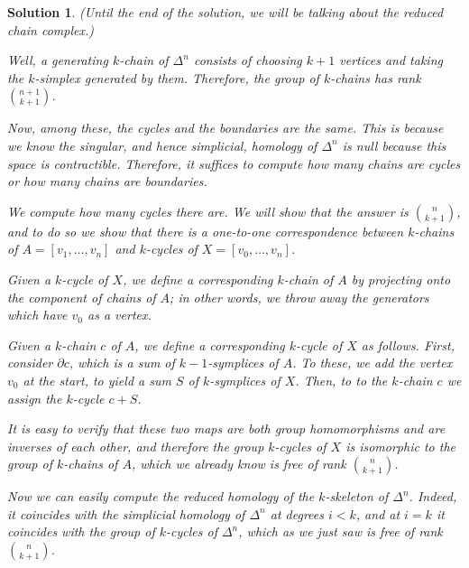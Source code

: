 \documentclass{article}
\theoremstyle{plain}
\theoremstyle{nonumberplain}
\newtheorem{sol}{Solution}
\begin{document}
\begin{sol}
(Until the end of the solution, we will be talking about the reduced chain complex.)

Well, a generating $k$-chain of $\Delta^n$ consists of choosing $k+1$ vertices and taking the $k$-simplex generated by them. Therefore, the group of $k$-chains has rank $\binom{n+1}{k+1}$.

Now, among these, the cycles and the boundaries are the same. This is because we know the singular, and hence simplicial, homology of $\Delta^n$ is null because this space is contractible. Therefore, it suffices to compute how many chains are cycles or how many chains are boundaries.

We compute how many cycles there are. We will show that the answer is $\binom{n}{k+1}$, and to do so we show that there is a one-to-one correspondence between $k$-chains of $A = [v_1, \dots, v_n]$ and $k$-cycles of $X = [v_0, \dots, v_n]$.

Given a $k$-cycle of $X$, we define a corresponding $k$-chain of $A$ by projecting onto the component of chains of $A$; in other words, we throw away the generators which have $v_0$ as a vertex.

Given a $k$-chain $c$ of $A$, we define a corresponding $k$-cycle of $X$ as follows. First, consider $\partial c$, which is a sum of $k-1$-symplices of $A$. To these, we add the vertex $v_0$ at the start, to yield a sum $S$ of $k$-symplices of $X$. Then, to to the $k$-chain $c$ we assign the $k$-cycle $c + S$.

It is easy to verify that these two maps are both group homomorphisms and are inverses of each other, and therefore the group $k$-cycles of $X$ is isomorphic to the group of $k$-chains of $A$, which we already know is free of rank $\binom{n}{k+1}$.

\smallskip

Now we can easily compute the reduced homology of the $k$-skeleton of $\Delta^n$. Indeed, it coincides with the simplicial homology of $\Delta^n$ at degrees $i < k$, and at $i = k$ it coincides with the group of $k$-cycles of $\Delta^n$, which as we just saw is free of rank $\binom n {k+1}$.
\end{sol}
\end{document}

